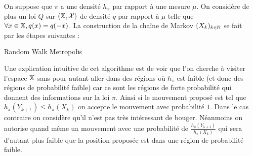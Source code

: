 \documentclass[10pt,a4paper]{article}
\begin{document}
On suppose que $\pi$ a une densité $h_\pi$ par rapport à une mesure $\mu$. On considère de plus un loi $Q$ sur $(\mathbb{X}, \mathcal{X})$ de densité $q$ par rapport à $\mu$ telle que $\forall x \in \mathbb{X}, q(x) = q(-x) $. La construction de la chaîne de Markov $(X_k)_{k \in \mathbb{N}}$ se fait par les étapes suivantes :

\begin{center}
\begin{algorithm}[H]
 \caption{Random Walk Metropolis}
\end{algorithm}
\end{center}

Une explication intuitive de cet algorithme est de voir que l'on cherche à visiter l'espace $\mathbb{X}$ sans pour autant aller dans des régions où $h_\pi$ est faible (et donc des régions de probabilité faible) car ce sont les régions de forte probabilité qui donnent des informations sur la loi $\pi$. Ainsi si le mouvement proposé est tel que $h_\pi(Y_{k+1}) \leq h_\pi(X_k)$ on accepte le mouvement avec probabilité $1$. Dans le cas contraire on considère qu'il n'est pas très intéressant de bouger. Néanmoins on autorise quand même un mouvement avec une probabilité de $\frac{h_\pi(Y_{k+1})}{h_\pi(X_k)}$ qui sera d'autant plus faible que la position proposée est dans une région de probabilité faible.

\pagebreak


\end{document}
